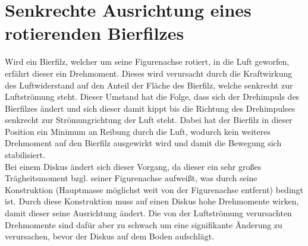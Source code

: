 

\section{Senkrechte Ausrichtung eines rotierenden Bierfilzes}
Wird ein Bierfilz, welcher um seine Figurenachse rotiert, in die Luft geworfen, erfährt dieser ein Drehmoment. Dieses wird verursacht durch die Kraftwirkung des Luftwiderstand auf den Anteil der Fläche des Bierfilz, welche senkrecht zur Luftströmung steht. Dieser Umstand hat die Folge, dass sich der Drehimpuls des Bierfilzes ändert und sich dieser damit kippt bis die Richtung des Drehimpulses senkrecht zur Strömungrichtung der Luft steht. Dabei hat der Bierfilz in dieser Position ein Minimum an Reibung durch die Luft, wodurch kein weiteres Drehmoment auf den Bierfilz ausgewirkt wird und damit die Bewegung sich stabilisiert.\\
Bei einem Diskus ändert sich dieser Vorgang, da dieser ein sehr großes Trägheitsmoment bzgl. seiner Figurenachse aufweißt, was durch seine Konstruktion (Hauptmasse möglichst weit von der Figurenachse entfernt) bedingt ist. Durch diese Konstruktion muss auf einen Diskus hohe Drehmomente wirken, damit dieser seine Ausrichtung ändert. Die von der Luftströmung verursachten Drehmomente sind dafür aber zu schwach um eine signifikante Änderung zu verursachen, bevor der Diskus auf dem Boden aufschlägt.